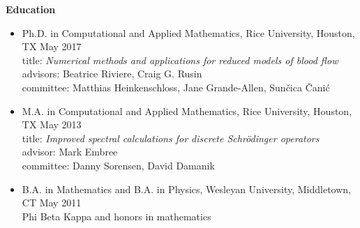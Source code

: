 \documentclass{article} %
\begin{document}
\vspace{0.5cm}
\noindent
{\bf \large Education}
\begin{itemize}
\item Ph.D. in Computational and Applied Mathematics, Rice University, Houston, TX \hspace*{\fill} May 2017 \\
title: {\em Numerical methods and applications for reduced models of blood flow} \\
advisors: Beatrice Riviere, Craig G. Rusin  \\
committee: Matthias Heinkenschloss, Jane Grande-Allen, Sun\v{c}ica \v{C}ani\'c 
\item M.A. in Computational and Applied Mathematics, Rice University, Houston, TX \hspace*{\fill} May 2013 \\
title: {\em Improved spectral calculations for discrete Schr\"odinger operators} \\
advisor: Mark Embree \\
committee: Danny Sorensen, David Damanik
\item B.A. in Mathematics and B.A. in Physics, Wesleyan University, Middletown, CT \hspace*{\fill} May 2011 \\
Phi Beta Kappa and honors in mathematics
\end{itemize}
\end{document}
